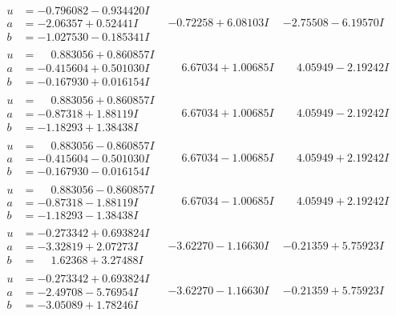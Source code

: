 \documentclass[1p]{elsarticle_modified}
\theoremstyle{definition}
\begin{document}
$$\begin{array}{c|c|c}
\begin{aligned}
u &= -0.796082 - 0.934420 I \\
a &= -2.06357 + 0.52441 I \\
b &= -1.027530 - 0.185341 I\end{aligned}
 & -0.72258 + 6.08103 I & -2.75508 - 6.19570 I \\ \hline\begin{aligned}
u &= \phantom{-}0.883056 + 0.860857 I \\
a &= -0.415604 + 0.501030 I \\
b &= -0.167930 + 0.016154 I\end{aligned}
 & \phantom{-}6.67034 + 1.00685 I & \phantom{-}4.05949 - 2.19242 I \\ \hline\begin{aligned}
u &= \phantom{-}0.883056 + 0.860857 I \\
a &= -0.87318 + 1.88119 I \\
b &= -1.18293 + 1.38438 I\end{aligned}
 & \phantom{-}6.67034 + 1.00685 I & \phantom{-}4.05949 - 2.19242 I \\ \hline\begin{aligned}
u &= \phantom{-}0.883056 - 0.860857 I \\
a &= -0.415604 - 0.501030 I \\
b &= -0.167930 - 0.016154 I\end{aligned}
 & \phantom{-}6.67034 - 1.00685 I & \phantom{-}4.05949 + 2.19242 I \\ \hline\begin{aligned}
u &= \phantom{-}0.883056 - 0.860857 I \\
a &= -0.87318 - 1.88119 I \\
b &= -1.18293 - 1.38438 I\end{aligned}
 & \phantom{-}6.67034 - 1.00685 I & \phantom{-}4.05949 + 2.19242 I \\ \hline\begin{aligned}
u &= -0.273342 + 0.693824 I \\
a &= -3.32819 + 2.07273 I \\
b &= \phantom{-}1.62368 + 3.27488 I\end{aligned}
 & -3.62270 - 1.16630 I & -0.21359 + 5.75923 I \\ \hline\begin{aligned}
u &= -0.273342 + 0.693824 I \\
a &= -2.49708 - 5.76954 I \\
b &= -3.05089 + 1.78246 I\end{aligned}
 & -3.62270 - 1.16630 I & -0.21359 + 5.75923 I \\ \hline\begin{aligned}

\end{aligned}
\end{array}$$
\end{document}

